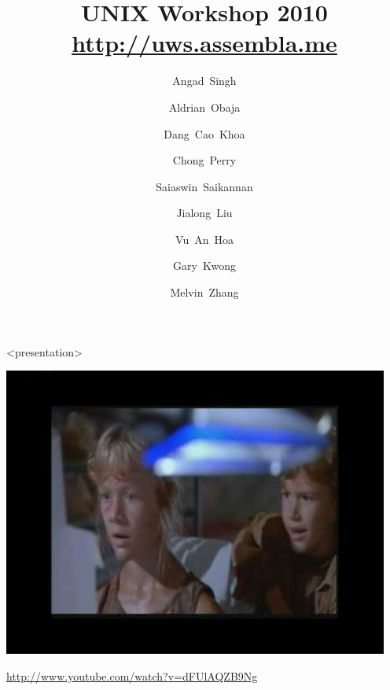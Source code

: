 \usepackage{graphicx} 
\usepackage{verbatim}
\usepackage{hyperref}
\hypersetup{
    colorlinks,%
    citecolor=black,%
    filecolor=black,%
    linkcolor=black,%
    urlcolor=blue
}

\graphicspath{{../figures/}}


\newcommand{\ftitle}[1]{\frametitle<presentation>{#1}}
\newcommand{\cmd}[1]{\begin{quote}{\tt #1}\end{quote}}
\newcommand{\lit}[1]{\texttt{#1}}

\title{UNIX Workshop 2010\\\url{http://uws.assembla.me}}
\author{
Angad~Singh \and 
Aldrian~Obaja \and
Dang~Cao~Khoa \and
Chong~Perry \and
Saiaswin~Saikannan \and
Jialong~Liu\\ \and
Vu~An~Hoa \and
Gary~Kwong \and
Melvin~Zhang
}



\maketitle


\begin{frame}<presentation>
\begin{center}
\includegraphics[width=\textwidth]{jurassic_park}

\url{http://www.youtube.com/watch?v=dFUlAQZB9Ng}
\end{center}
\end{frame}

